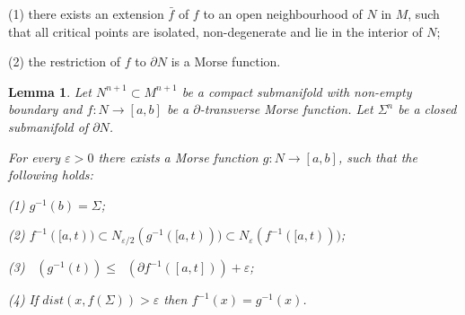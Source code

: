 \documentclass[12pt]{amsart}
\newtheorem{lemma}[theorem]{Lemma}
\DeclareMathOperator{\Hn}{\mathcal{H}^n}
\theoremstyle{definition}
\begin{document}
(1) there exists an extension $\bar{f}$ of $f$ to an open neighbourhood of $N$ in $M$, such that all critical points are 
isolated, non-degenerate and lie in the interior of $N$;

(2) the restriction of $f$ to $\partial N$
is a Morse function.

\begin{lemma} \label{morse}
Let $N^{n+1} \subset M^{n+1}$ be a compact submanifold 
with non-empty boundary and $f: N \rightarrow [a,b]$
be a $\partial$-transverse Morse function. Let $\Sigma^{n}$ be
a closed submanifold of $\partial N$.

For every $\varepsilon >0$ there exists a Morse function $g: N \rightarrow [a,b]$,
such that the following holds:

(1) %
$g^{-1}(b) = \Sigma$;

(2) $f^{-1}([a,t)) \subset N_{\varepsilon/2} (g^{-1}([a,t))) \subset N_{\varepsilon}(f^{-1}([a,t)))$;

(3) $ \Hn(g^{-1}(t)) \leq \Hn(\partial f^{-1}([a,t])) + \varepsilon$;

(4) If $dist(x, f(\Sigma))> \varepsilon$ then $f^{-1} (x) = g^{-1}(x)$.
\end{lemma}
\end{document}
